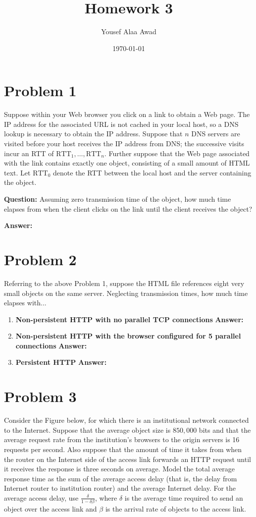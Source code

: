 \documentclass[12pt, letterpaper]{article}
\title{\textbf{Homework 3}}
\author{Yousef Alaa Awad}
\date{\today}
\newcommand{\problem}[1]{\section*{Problem #1}}
\newcommand{\question}[1]{\noindent\textbf{Question: }#1\par\vspace{0.5em}}
\newcommand{\answer}{\noindent\textbf{Answer:}\par\vspace{1em}}
\begin{document}
\maketitle

\problem{1}
Suppose within your Web browser you click on a link to obtain a Web page. The IP address for the associated
URL is not cached in your local host, so a DNS lookup is necessary to obtain the IP address. Suppose that $n$
DNS servers are visited before your host receives the IP address from DNS; the successive visits incur an RTT
of $\text{RTT}_1, \dots, \text{RTT}_n$. Further suppose that the Web page associated with the link contains exactly
one object, consisting of a small amount of HTML text. Let $\text{RTT}_0$ denote the RTT between the local host
and the server containing the object.

\question{
  Assuming zero transmission time of the object, how much time elapses from when the client clicks on the link until
  the client receives the object?
}
\answer


\problem{2}
Referring to the above Problem 1, suppose the HTML file references eight very small objects on the same server.
Neglecting transmission times, how much time elapses with...

\begin{enumerate}[label=\alph*.]
	\item \textbf{Non-persistent HTTP with no parallel TCP connections} \newline
	      \answer

	\item \textbf{Non-persistent HTTP with the browser configured for 5 parallel connections} \newline
	      \answer

	\item \textbf{Persistent HTTP} \newline
	      \answer
\end{enumerate}


\problem{3}
Consider the Figure below, for which there is an institutional network connected to the Internet. Suppose that the 
average object size is $850,000$ bits and that the average request rate from the institution’s browsers to the origin
servers is 16 requests per second. Also suppose that the amount of time it takes from when the router on the Internet
side of the access link forwards an HTTP request until it receives the response is three seconds on average. Model the
total average response time as the sum of the average access delay (that is, the delay from Internet router to
institution router) and the average Internet delay. For the average access delay, use $\frac{\delta}{1-\delta\beta}$,
where $\delta$ is the average time required to send an object over the access link and $\beta$ is the arrival rate of
objects to the access link.
\end{document}
